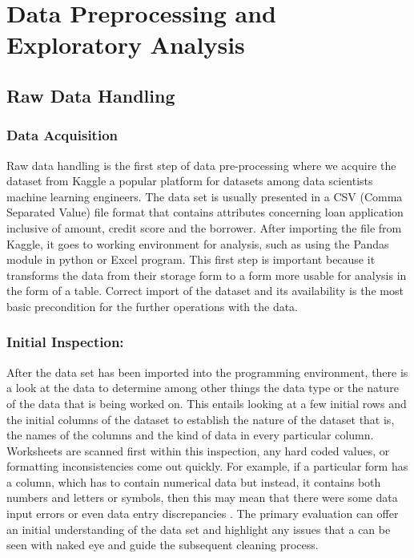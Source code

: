 \documentclass[12pt, a4paper,oneside]{book}
\numberwithin{equation}{section}
\begin{document}
\newpage
\chapter{Data Preprocessing and Exploratory Analysis}
\section{Raw Data Handling}
\subsection{Data Acquisition } 
Raw data handling is the first step of data pre-processing where we acquire the dataset from Kaggle a popular platform for datasets among data scientists machine learning engineers. The data set is usually presented in a CSV (Comma Separated Value) file format that contains attributes concerning loan application inclusive of amount, credit score and the borrower. After importing the file from Kaggle, it goes to working environment for analysis, such as using the Pandas module in python \cite{mckinney2022python} or Excel program. This first step is important because it transforms the data from their storage form to a form more usable for analysis in the form of a table. Correct import of the dataset and its availability is the most basic precondition for the further operations with the data. 

\subsection{Initial Inspection:} 

After the data set has been imported into the programming environment, there is a look at the data to determine among other things the data type or the nature of the data that is being worked on. This entails looking at a few initial rows and the initial columns of the dataset to establish the nature of the dataset that is, the names of the columns and the kind of data in every particular column. Worksheets are scanned first within this inspection, any hard coded values, or formatting inconsistencies come out quickly. For example, if a particular form has a column, which has to contain numerical data but instead, it contains both numbers and letters or symbols, then this may mean that there were some data input errors or even data entry discrepancies \cite{pedregosa2011scikit}. The primary evaluation can offer an initial understanding of the data set and highlight any issues that a can be seen with naked eye and guide the subsequent cleaning process. 
\end{document}
